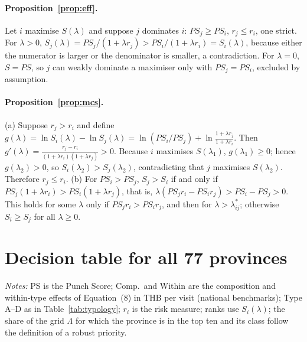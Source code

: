 \documentclass[11pt,a4paper]{article}
\newcommand{\PS}{\mathit{PS}}
\theoremstyle{plain}\newtheorem{proposition}{Proposition}
\theoremstyle{definition}\newtheorem{definition}{Definition}
\begin{document}
\paragraph{Proposition~\ref{prop:eff}.} Let $i$ maximise $S(\lambda)$ and suppose $j$ dominates $i$: $\PS_j\ge\PS_i$, $r_j\le r_i$, one strict. For $\lambda>0$, $S_j(\lambda)=\PS_j/(1+\lambda r_j)>\PS_i/(1+\lambda r_i)=S_i(\lambda)$, because either the numerator is larger or the denominator is smaller, a contradiction. For $\lambda=0$, $S=\PS$, so $j$ can weakly dominate a maximiser only with $\PS_j=\PS_i$, excluded by assumption.

\paragraph{Proposition~\ref{prop:mcs}.} (a) Suppose $r_j>r_i$ and define $g(\lambda)=\ln S_i(\lambda)-\ln S_j(\lambda)=\ln(\PS_i/\PS_j)+\ln\frac{1+\lambda r_j}{1+\lambda r_i}$. Then $g'(\lambda)=\frac{r_j-r_i}{(1+\lambda r_i)(1+\lambda r_j)}>0$. Because $i$ maximises $S(\lambda_1)$, $g(\lambda_1)\ge0$; hence $g(\lambda_2)>0$, so $S_i(\lambda_2)>S_j(\lambda_2)$, contradicting that $j$ maximises $S(\lambda_2)$. Therefore $r_j\le r_i$. (b) For $\PS_i>\PS_j$, $S_j>S_i$ if and only if $\PS_j(1+\lambda r_i)>\PS_i(1+\lambda r_j)$, that is, $\lambda(\PS_jr_i-\PS_ir_j)>\PS_i-\PS_j>0$. This holds for some $\lambda$ only if $\PS_jr_i>\PS_ir_j$, and then for $\lambda>\lambda^{*}_{ij}$; otherwise $S_i\ge S_j$ for all $\lambda\ge0$.

\section{Decision table for all 77 provinces}
\begin{landscape}\begin{center}\scriptsize\setlength{\tabcolsep}{3pt}
\label{tab:decfull}

\end{center}
{\scriptsize\emph{Notes:} PS is the Punch Score; Comp.\ and Within are the composition and within-type effects of Equation~(8) in THB per visit (national benchmarks); Type A--D as in Table~\ref{tab:typology}; $r_i$ is the risk measure; ranks use $S_i(\lambda)$; the share of the grid $\Lambda$ for which the province is in the top ten and its class follow the definition of a robust priority.}\end{landscape}
\end{document}
